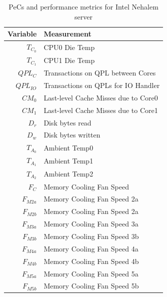 \documentclass[acmtaco]{acmtrans2m}
\begin{document}
\begin{table}[t!]
  \caption{PeCs and performance metrics for Intel Nehalem server}
  \centering
  \label{tab:intelmodel}
  \begin{tabular}{r l}
\hline
\textbf{Variable}&\textbf{Measurement}\\
\hline
$T_{C_{0}}$&CPU0 Die Temp\\
$T_{C_{1}}$&CPU1 Die Temp\\
$QPL_{C}$&Transactions on QPL between Cores\\
$QPL_{IO}$&Transactions on QPLs for IO Handler\\
$CM_{0}$&Last-level Cache Misses due to Core0\\
$CM_{1}$&Last-level Cache Misses due to Core1\\
$D_{r}$&Disk bytes read\\
$D_{w}$&Disk bytes written\\
$T_{A_{0}}$&Ambient Temp0\\
$T_{A_{1}}$&Ambient Temp1\\
$T_{A_{2}}$&Ambient Temp2\\
$F_{C}$&Memory Cooling Fan Speed\\
$F_{M2a}$&Memory Cooling Fan Speed 2a\\
$F_{M2b}$&Memory Cooling Fan Speed 2a\\
$F_{M3a}$&Memory Cooling Fan Speed 3a\\
$F_{M3b}$&Memory Cooling Fan Speed 3b\\
$F_{M4a}$&Memory Cooling Fan Speed 4a\\
$F_{M4b}$&Memory Cooling Fan Speed 4b\\
$F_{M5a}$&Memory Cooling Fan Speed 5a\\
$F_{M5b}$&Memory Cooling Fan Speed 5b\\
\hline
  \end{tabular}
\end{table}
\end{document}
